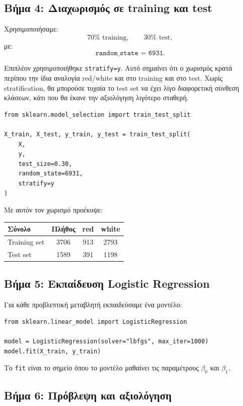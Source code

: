 \documentclass[11pt,a4paper]{article}
\newcommand{\code}[1]{\texttt{#1}}
\begin{document}
\subsection{Βήμα 4: Διαχωρισμός σε training και test}

Χρησιμοποιήσαμε:
\[
70\% \text{ training}, \qquad 30\% \text{ test},
\]
με:
\[
\code{random\_state = 6931}.
\]

Επιπλέον χρησιμοποιήθηκε \code{stratify=y}. Αυτό σημαίνει ότι ο χωρισμός
κρατά περίπου την ίδια αναλογία red/white και στο training και στο test.
Χωρίς stratification, θα μπορούσε τυχαία το test set να έχει λίγο
διαφορετική σύνθεση κλάσεων, κάτι που θα έκανε την αξιολόγηση λιγότερο
σταθερή.

\begin{lstlisting}
from sklearn.model_selection import train_test_split

X_train, X_test, y_train, y_test = train_test_split(
    X,
    y,
    test_size=0.30,
    random_state=6931,
    stratify=y
)
\end{lstlisting}

Με αυτόν τον χωρισμό προέκυψε:

\begin{center}
\begin{tabular}{lccc}
\toprule
Σύνολο & Πλήθος & red & white \\
\midrule
Training set & 3706 & 913 & 2793 \\
Test set & 1589 & 391 & 1198 \\
\bottomrule
\end{tabular}
\end{center}

\subsection{Βήμα 5: Εκπαίδευση Logistic Regression}

Για κάθε προβλεπτική μεταβλητή εκπαιδεύσαμε ένα μοντέλο:

\begin{lstlisting}
from sklearn.linear_model import LogisticRegression

model = LogisticRegression(solver="lbfgs", max_iter=1000)
model.fit(X_train, y_train)
\end{lstlisting}

Το \code{fit} είναι το σημείο όπου το μοντέλο μαθαίνει τις παραμέτρους
\(\beta_0\) και \(\beta_1\).

\subsection{Βήμα 6: Πρόβλεψη και αξιολόγηση}
\end{document}
